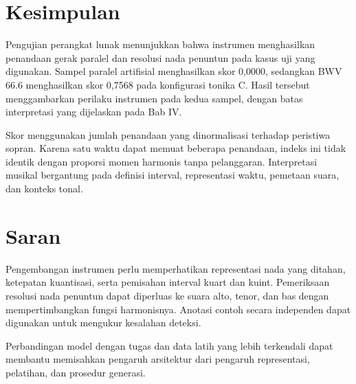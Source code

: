\section{Kesimpulan}

Pengujian perangkat lunak menunjukkan bahwa instrumen menghasilkan penandaan gerak paralel dan resolusi nada penuntun pada kasus uji yang digunakan. Sampel paralel artifisial menghasilkan skor 0,0000, sedangkan BWV 66.6 menghasilkan skor 0,7568 pada konfigurasi tonika C. Hasil tersebut menggambarkan perilaku instrumen pada kedua sampel, dengan batas interpretasi yang dijelaskan pada Bab IV.

Skor menggunakan jumlah penandaan yang dinormalisasi terhadap peristiwa sopran. Karena satu waktu dapat memuat beberapa penandaan, indeks ini tidak identik dengan proporsi momen harmonis tanpa pelanggaran. Interpretasi musikal bergantung pada definisi interval, representasi waktu, pemetaan suara, dan konteks tonal.

\section{Saran}

Pengembangan instrumen perlu memperhatikan representasi nada yang ditahan, ketepatan kuantisasi, serta pemisahan interval kuart dan kuint. Pemeriksaan resolusi nada penuntun dapat diperluas ke suara alto, tenor, dan bas dengan mempertimbangkan fungsi harmonisnya. Anotasi contoh secara independen dapat digunakan untuk mengukur kesalahan deteksi.

Perbandingan model dengan tugas dan data latih yang lebih terkendali dapat membantu memisahkan pengaruh arsitektur dari pengaruh representasi, pelatihan, dan prosedur generasi.
